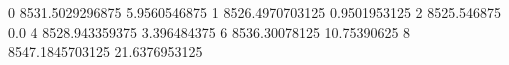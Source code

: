 0 8531.5029296875 5.9560546875
1 8526.4970703125 0.9501953125
2 8525.546875 0.0
4 8528.943359375 3.396484375
6 8536.30078125 10.75390625
8 8547.1845703125 21.6376953125
